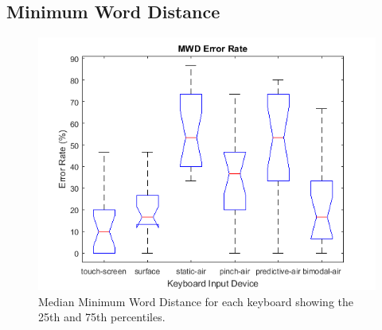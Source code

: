 \subsection{Minimum Word Distance}
\begin{figure}[h]
	\centering
	\includegraphics{fig_MWD_boxplot}
	\caption[Minimum Word Distance Boxplot]{Median Minimum Word Distance for each keyboard showing the 25th and 75th percentiles.}
	\label{fig_MWD_boxplot}
\end{figure}

